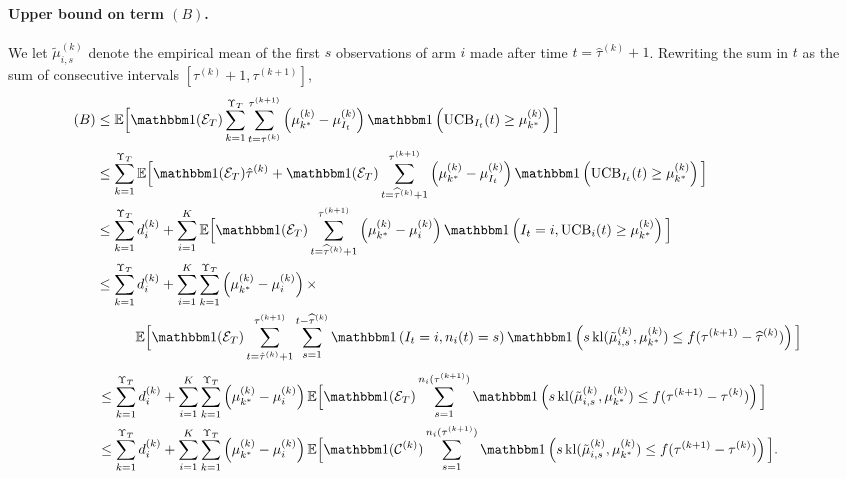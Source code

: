 \paragraph{Upper bound on term $(B)$.}
%
We let $\tilde{\mu}_{i,s}^{(k)}$ denote the empirical mean of the first $s$ observations of arm $i$ made after time $t=\hat{\tau}^{(k)}+1$. Rewriting the sum in $t$ as the sum of consecutive intervals $[\tau^{(k)}+1, \tau^{(k+1)}]$,
%
\begin{align*}
    (B) & \leq \bE\Big[\indic(\cE_T)\sum_{k=1}^{\Upsilon_T} \sum_{t=\tau^{(k)}}^{\tau^{(k+1)}}\left(\mu_{k^*}^{(k)} - \mu_{I_t}^{(k)}\right)\indic\left(\UCB_{I_t}(t) \geq \mu_{k^*}^{(k)}\right)\Big] \\
     & \leq \sum_{k=1}^{\Upsilon_T}\bE\Big[\indic(\cE_T)\hat{\tau}^{(k)} + \indic(\cE_T) \sum_{t=\widehat{\tau}^{(k)}+1}^{\tau^{(k+1)}}\left(\mu_{k^*}^{(k)} - \mu_{I_t}^{(k)}\right)\indic\left(\UCB_{I_t}(t) \geq \mu_{k^*}^{(k)}\right)\Big] \\
    & \leq \sum_{k=1}^{\Upsilon_T}d_i^{(k)}+ \sum_{i=1}^K \bE\Big[\indic(\cE_T) \sum_{t=\widehat{\tau}^{(k)}+1}^{\tau^{(k+1)}}\left(\mu_{k^*}^{(k)} - \mu_{i}^{(k)}\right)\indic\left(I_t=i,\UCB_{i}(t) \geq \mu_{k^*}^{(k)}\right)\Big] \\
    & \leq \sum_{k=1}^{\Upsilon_T}d_i^{(k)}+ \sum_{i=1}^K \sum_{k=1}^{\Upsilon_T}\left(\mu_{k^*}^{(k)} - \mu_{i}^{(k)}\right)\times \\
    &\hspace{1cm}\bE\Big[\indic(\cE_T) \sum_{t=\hat{\tau}^{(k)}+1}^{\tau^{(k+1)}}\sum_{s=1}^{t-\widehat{\tau}^{(k)}}\indic\left(I_t = i,n_i(t) = s\right) \indic\left(s \, \kl(\tilde{\mu}_{i,s}^{(k)}, \mu_{k^*}^{(k)}) \leq f(\tau^{(k+1)} - \widehat{\tau}^{(k)})\right)\Big]
\end{align*}
\begin{align*}
    & \leq \sum_{k=1}^{\Upsilon_T}d_i^{(k)}+ \sum_{i=1}^K \sum_{k=1}^{\Upsilon_T}\left(\mu_{k^*}^{(k)} - \mu_{i}^{(k)}\right)\bE\Big[\indic(\cE_T) \sum_{s=1}^{n_i(\tau^{(k+1)})}\indic\left(s \, \kl(\tilde{\mu}_{i,s}^{(k)}, \mu_{k^*}^{(k)}) \leq f(\tau^{(k+1)} - \tau^{(k)})\right)\Big]  \\
    & \leq \sum_{k=1}^{\Upsilon_T}d_i^{(k)}+ \sum_{i=1}^K \sum_{k=1}^{\Upsilon_T}\left(\mu_{k^*}^{(k)} - \mu_{i}^{(k)}\right)\bE\Big[\indic(\cC^{(k)}) \sum_{s=1}^{n_i(\tau^{(k+1)})}\indic\left(s \, \kl(\tilde{\mu}_{i,s}^{(k)}, \mu_{k^*}^{(k)}) \leq f(\tau^{(k+1)} - \tau^{(k)})\right)\Big].
\end{align*}

